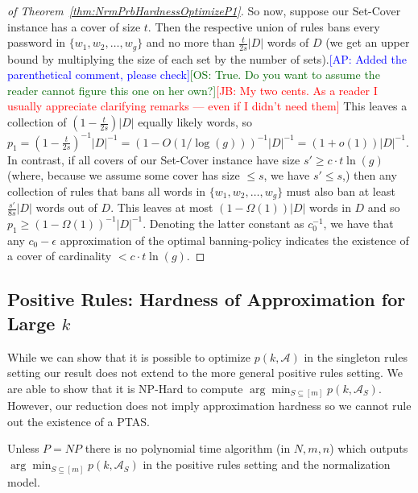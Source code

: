 \documentclass[prodmode,acmec]{ec-acmsmall}
\newcommand{\kibitz}[2]{\ifnum\Comments=1\textcolor{#1}{#2}\fi}
\newcommand{\ap}[1]{\kibitz{blue} {[AP: #1]}}
\newcommand{\os}[1]{\kibitz{darkgreen} {[OS: #1]}}
\newcommand{\jb}[1]{\kibitz{red} {[JB: #1]}}
\begin{document}
\begin{proof}[of Theorem~\ref{thm:NrmPrbHardnessOptimizeP1}]
So now, suppose our Set-Cover instance has a cover of size $t$. Then the respective union of rules bans every password in $\{w_1, w_2, \ldots, w_g\}$ and no more than $\tfrac t {2s} |D|$ words of $D$ (we get an upper bound by multiplying the size of each set by the number of sets).\ap{Added the parenthetical comment, please check}\os{True. Do you want to assume the reader cannot figure this one on her own?}\jb{My two cents. As a reader I usually appreciate clarifying remarks --- even if I didn't need them} This leaves a collection of $\left(1-\tfrac t {2s}\right) |D|$ equally likely words, so $p_1 = \left(1-\tfrac t {2s}\right)^{-1}|D|^{-1} = (1-O(1/\log(g)))^{-1}|D|^{-1} = (1+o(1))|D|^{-1}$.  In contrast, if all covers of our Set-Cover instance have size $s' \geq c\cdot t\ln(g)$ (where, because we assume some cover has size $\leq s$, we have $s'\leq s$,) then any collection of rules that bans all words in $\{w_1, w_2, \ldots, w_g\}$ must also ban at least $\tfrac {s'}{8s} |D|$ words out of $D$. This leaves at most $(1-\Omega(1))|D|$ words in $D$ and so $p_1 \geq (1-\Omega(1))^{-1}|D|^{-1}$. Denoting the latter constant as $c_0^{-1}$, we have that any $c_0-\epsilon$ approximation of the optimal banning-policy indicates the existence of a cover of cardinality $< c\cdot t\ln(g)$. 
\end{proof}


\subsection{Positive Rules: Hardness of Approximation for  Large $k$}

While we can show that it is possible to optimize $p\left(k,\mathcal{A}\right)$ in the singleton rules setting our result does not extend to the more general positive rules setting. We are able to show that it is NP-Hard to compute $\arg\min_{S \subseteq [m]} p\left(k,\mathcal{A}_S \right)$. However, our reduction does not imply approximation hardness so we cannot rule out the existence of a PTAS.

\newcommand{\thmHardnessAddingSubsetsLargeK}{Unless $P=NP$ there is no polynomial time algorithm (in $N,m,n$) which outputs  $\arg\min_{S \subseteq [m]} p\left(k,\mathcal{A}_S \right)$ in the positive rules setting and the normalization model.}

\begin{theorem} \label{thm:HardnessAddingSubsetsLargeK}
\thmHardnessAddingSubsetsLargeK
\end{theorem}
\end{document}
